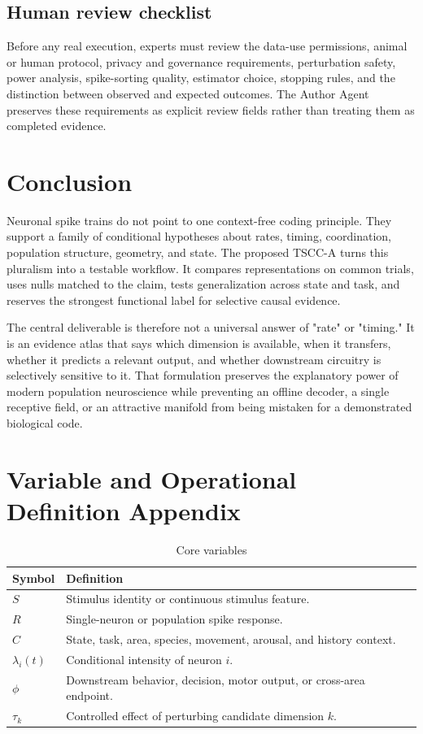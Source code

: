 \documentclass[conference]{IEEEtran}
\begin{document}
\subsection{Human review checklist}
Before any real execution, experts must review the data-use permissions, animal or human protocol, privacy and governance requirements, perturbation safety, power analysis, spike-sorting quality, estimator choice, stopping rules, and the distinction between observed and expected outcomes. The Author Agent preserves these requirements as explicit review fields rather than treating them as completed evidence.

\section{Conclusion}
Neuronal spike trains do not point to one context-free coding principle. They support a family of conditional hypotheses about rates, timing, coordination, population structure, geometry, and state. The proposed TSCC-A turns this pluralism into a testable workflow. It compares representations on common trials, uses nulls matched to the claim, tests generalization across state and task, and reserves the strongest functional label for selective causal evidence.

The central deliverable is therefore not a universal answer of "rate" or "timing." It is an evidence atlas that says which dimension is available, when it transfers, whether it predicts a relevant output, and whether downstream circuitry is selectively sensitive to it. That formulation preserves the explanatory power of modern population neuroscience while preventing an offline decoder, a single receptive field, or an attractive manifold from being mistaken for a demonstrated biological code.

\appendices
\section{Variable and Operational Definition Appendix}
\begin{table}[h]
\caption{Core variables}
\label{tab:variables}
\centering
\footnotesize
\begin{tabular}{p{}p{}}
\toprule
Symbol & Definition \\
\midrule
$S$ & Stimulus identity or continuous stimulus feature. \\
$R$ & Single-neuron or population spike response. \\
$C$ & State, task, area, species, movement, arousal, and history context. \\
$\lambda_i(t)$ & Conditional intensity of neuron $i$. \\
$\phi$ & Downstream behavior, decision, motor output, or cross-area endpoint. \\
$\tau_k$ & Controlled effect of perturbing candidate dimension $k$. \\
\bottomrule
\end{tabular}
\end{table}
\end{document}
